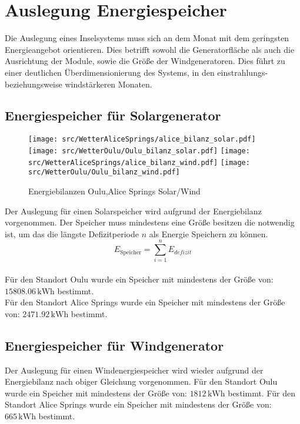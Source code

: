 \section{Auslegung Energiespeicher}
  Die Auslegung eines Inselsystems muss sich an dem Monat mit dem geringsten Energieangebot orientieren. Dies betrifft sowohl die Generatorfläche als auch die Ausrichtung der Module, sowie die Größe der Windgeneratoren. 
  Dies führt zu einer deutlichen Überdimensionierung des Systems, in den einstrahlungs- beziehungsweise windstärkeren Monaten.
  \newpage
  \subsection{Energiespeicher für Solargenerator}
  \begin{figure}
    \centering
    \texttt{[image: src/WetterAliceSprings/alice\_bilanz\_solar.pdf]}
    \texttt{[image: src/WetterOulu/Oulu\_bilanz\_solar.pdf]}
    \texttt{[image: src/WetterAliceSprings/alice\_bilanz\_wind.pdf]}
    \texttt{[image: src/WetterOulu/Oulu\_bilanz\_wind.pdf]}
    \caption{Energiebilanzen Oulu,Alice Springs Solar/Wind}\label{fig:SpeicherSol}
  \end{figure}
  Der Auslegung für einen Solarspeicher wird aufgrund der Energiebilanz vorgenommen.
  Der Speicher muss mindestens eine Größe besitzen die notwendig ist, um das die längste Defizitperiode \(n\) als Energie Speichern zu können.
  \[E_\mathrm{Speicher} = \sum_{i=1}^{n} E_{defizit}\]\\

  Für den Standort Oulu wurde ein Speicher mit mindestens der Größe von: \(\mathrm{15808.06\,kWh}\) bestimmt.\\
  Für den Standort Alice Springs wurde ein Speicher mit mindestens der Größe von: \(\mathrm{2471.92\,kWh}\) bestimmt.
  
  \subsection{Energiespeicher für Windgenerator}
  Der Auslegung für einen Windenergiespeicher wird wieder aufgrund der Energiebilanz nach obiger Gleichung vorgenommen.
  Für den Standort Oulu wurde ein Speicher mit mindestens der Größe von: \(\mathrm{1812\,kWh}\) bestimmt.
  Für den Standort Alice Springs wurde ein Speicher mit mindestens der Größe von: \(\mathrm{665\,kWh}\) bestimmt.
  